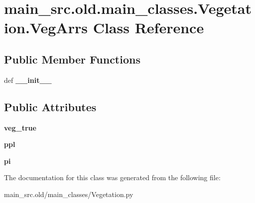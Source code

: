\hypertarget{classmain__src_8old_1_1main__classes_1_1Vegetation_1_1VegArrs}{\section{main\-\_\-src.\-old.\-main\-\_\-classes.\-Vegetation.\-Veg\-Arrs Class Reference}
\label{classmain__src_8old_1_1main__classes_1_1Vegetation_1_1VegArrs}
}
\subsection*{Public Member Functions}
\begin{DoxyCompactItemize}
\item 
\hypertarget{classmain__src_8old_1_1main__classes_1_1Vegetation_1_1VegArrs_aa916a5971cdbea0b668dd103f38398b1}{def {\bfseries \-\_\-\-\_\-init\-\_\-\-\_\-}}\label{classmain__src_8old_1_1main__classes_1_1Vegetation_1_1VegArrs_aa916a5971cdbea0b668dd103f38398b1}

\end{DoxyCompactItemize}
\subsection*{Public Attributes}
\begin{DoxyCompactItemize}
\item 
\hypertarget{classmain__src_8old_1_1main__classes_1_1Vegetation_1_1VegArrs_a4d2417a4328b0c5a2691ca21e1e06984}{{\bfseries veg\-\_\-true}}\label{classmain__src_8old_1_1main__classes_1_1Vegetation_1_1VegArrs_a4d2417a4328b0c5a2691ca21e1e06984}

\item 
\hypertarget{classmain__src_8old_1_1main__classes_1_1Vegetation_1_1VegArrs_ae0a0a0aca3d85f56ef0cde6dc456694e}{{\bfseries ppl}}\label{classmain__src_8old_1_1main__classes_1_1Vegetation_1_1VegArrs_ae0a0a0aca3d85f56ef0cde6dc456694e}

\item 
\hypertarget{classmain__src_8old_1_1main__classes_1_1Vegetation_1_1VegArrs_a53657e5180a1c381755bce03668ebddb}{{\bfseries pi}}\label{classmain__src_8old_1_1main__classes_1_1Vegetation_1_1VegArrs_a53657e5180a1c381755bce03668ebddb}

\end{DoxyCompactItemize}


The documentation for this class was generated from the following file\-:\begin{DoxyCompactItemize}
\item 
main\-\_\-src.\-old/main\-\_\-classes/Vegetation.\-py\end{DoxyCompactItemize}
